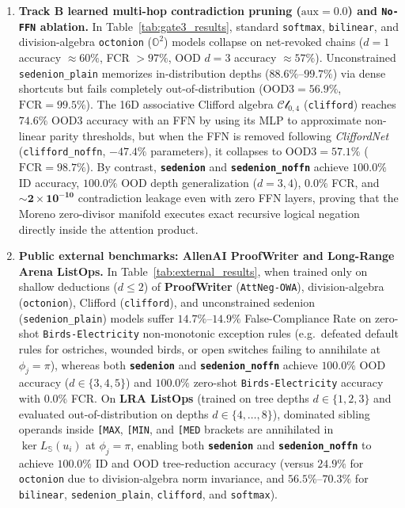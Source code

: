 \documentclass[11pt,a4paper]{article}
\theoremstyle{definition}
\theoremstyle{remark}
\newcommand{\Oc}{\mathbb{O}}
\newcommand{\Se}{\mathbb{S}}
\begin{document}
\begin{enumerate}
    \item \textbf{Track B learned multi-hop contradiction pruning ($\text{aux} = 0.0$) and \texttt{No-FFN} ablation.} In Table~\ref{tab:gate3_results}, standard \texttt{softmax}, \texttt{bilinear}, and division-algebra \texttt{octonion} ($\Oc^2$) models collapse on net-revoked chains ($d=1$ accuracy $\approx 60\%$, FCR $> 97\%$, OOD $d=3$ accuracy $\approx 57\%$). Unconstrained \texttt{sedenion\_plain} memorizes in-distribution depths ($88.6\%$--$99.7\%$) via dense shortcuts but fails completely out-of-distribution ($\text{OOD3} = 56.9\%$, $\text{FCR} = 99.5\%$). The 16D associative Clifford algebra $\mathcal{Cl}_{0,4}$ (\texttt{clifford}) reaches $74.6\%$ OOD3 accuracy with an FFN by using its MLP to approximate non-linear parity thresholds, but when the FFN is removed following \textit{CliffordNet} \cite{Ji2026CliffordNet} (\texttt{clifford\_noffn}, $-47.4\%$ parameters), it collapses to $\text{OOD3} = 57.1\%$ ($\text{FCR} = 98.7\%$). By contrast, \textbf{\texttt{sedenion}} and \textbf{\texttt{sedenion\_noffn}} achieve $\mathbf{100.0\%}$ ID accuracy, $\mathbf{100.0\%}$ OOD depth generalization ($d=3, 4$), $\mathbf{0.0\%}$ FCR, and $\sim \mathbf{2 \times 10^{-10}}$ contradiction leakage even with zero FFN layers, proving that the Moreno zero-divisor manifold executes exact recursive logical negation directly inside the attention product.
    \item \textbf{Public external benchmarks: AllenAI ProofWriter and Long-Range Arena ListOps.} In Table~\ref{tab:external_results}, when trained only on shallow deductions ($d \le 2$) of \textbf{ProofWriter} \cite{Tafjord2021ProofWriter} (\texttt{AttNeg-OWA}), division-algebra (\texttt{octonion}), Clifford (\texttt{clifford}), and unconstrained sedenion (\texttt{sedenion\_plain}) models suffer $14.7\%$--$14.9\%$ False-Compliance Rate on zero-shot \texttt{Birds-Electricity} non-monotonic exception rules (e.g.\ defeated default rules for ostriches, wounded birds, or open switches failing to annihilate at $\phi_j = \pi$), whereas both \textbf{\texttt{sedenion}} and \textbf{\texttt{sedenion\_noffn}} achieve $\mathbf{100.0\%}$ OOD accuracy ($d \in \{3,4,5\}$) and $\mathbf{100.0\%}$ zero-shot \texttt{Birds-Electricity} accuracy with $\mathbf{0.0\%}$ FCR. On \textbf{LRA ListOps} \cite{Nangia2018ListOps,Tay2021LRA} (trained on tree depths $d \in \{1,2,3\}$ and evaluated out-of-distribution on depths $d \in \{4,\dots,8\}$), dominated sibling operands inside \texttt{[MAX}, \texttt{[MIN}, and \texttt{[MED} brackets are annihilated in $\ker L_{\Se}(u_i)$ at $\phi_j = \pi$, enabling both \textbf{\texttt{sedenion}} and \textbf{\texttt{sedenion\_noffn}} to achieve $\mathbf{100.0\%}$ ID and OOD tree-reduction accuracy (versus $24.9\%$ for \texttt{octonion} due to division-algebra norm invariance, and $56.5\%$--$70.3\%$ for \texttt{bilinear}, \texttt{sedenion\_plain}, \texttt{clifford}, and \texttt{softmax}).
\end{enumerate}
\end{document}

